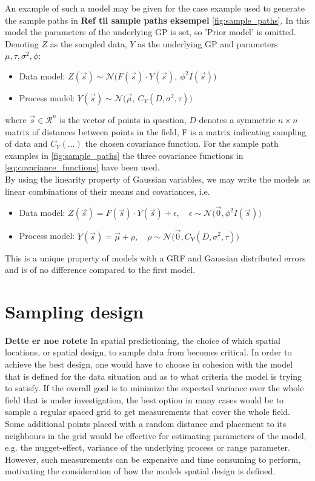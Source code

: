 \documentclass{report}
\begin{document}
An example of such a model may be given for the case example used to generate the sample paths in \textbf{Ref til sample paths eksempel} \ref{fig:sample_paths}. In this model the parameters of the underlying GP is set, so 'Prior model' is omitted. Denoting $Z$ as the sampled data, $Y$ as the underlying GP and parameters $\mu, \tau, \sigma^2, \phi$:
\begin{itemize}
\item Data model: $Z(\vec{s}) \sim \mathcal{N}\big(F(\vec{s}) \cdot Y(\vec{s}), \ \phi^2I(\vec{s})\big)$
\item Process model: $Y(\vec{s}) \sim \mathcal{N}\big( \vec{\mu}, \ C_Y(D, \sigma^2, \tau) \big)$ 
\end{itemize}
where $\vec{s} \in \mathcal{R}^n$ is the vector of points in question, $D$ denotes a symmetric $n \times n$ matrix of distances between points in the field, F is a matrix indicating sampling of data and $C_Y(\dots)$ the chosen covariance function. For the sample path examples in \ref{fig:sample_paths} the three covariance functions in \ref{eq:covariance_functions} have been used. \\

By using the linearity property of Gaussian variables, we may write the models as linear combinations of their means and covariances, i.e. 
\begin{itemize}
\item Data model: $Z(\vec{s}) = F(\vec{s}) \cdot Y(\vec{s}) + \epsilon, \quad \epsilon \sim \mathcal{N} \big(\vec{0},\phi^2I(\vec{s}) \big)$
\item Process model: $Y(\vec{s}) = \vec{\mu} + \rho, \quad \rho \sim \mathcal{N} \big(\vec{0}, C_Y(D, \sigma^2, \tau ) \big) $ 
\end{itemize}
This is a unique property of models with a GRF and Gaussian distributed errors and is of no difference compared to the first model.

\section{Sampling design} 
\label{sec:sampling_design}
\textbf{Dette er noe rotete}
In spatial predictioning, the choice of which spatial locations, or spatial design, to sample data from becomes critical. In order to achieve the best design, one would have to choose in cohesion with the model that is defined for the data situation and as to what criteria the model is trying to satisfy. If the overall goal is to minimize the expected variance over the whole field that is under investigation, the best option in many cases would be to sample a regular spaced grid to get measurements that cover the whole field. Some additional points placed with a random distance and placement to its neighbours in the grid would be effective for estimating parameters of the model, e.g. the nugget-effect, variance of the underlying process or range parameter. However, such measurements can be expensive and time consuming to perform, motivating the consideration of how the models spatial design is defined. \\
\end{document}
